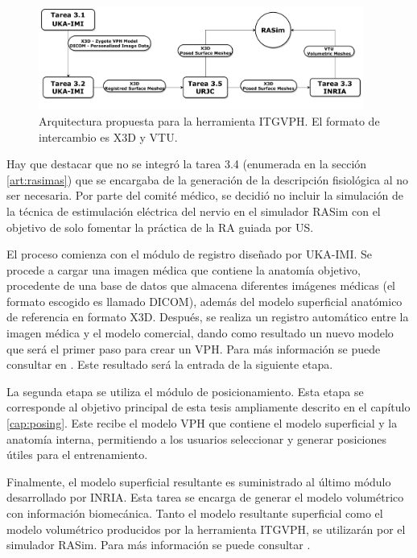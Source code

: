 \begin{figure}
    \centering
    \includegraphics[width=0.95\textwidth]{IMG/DiagramaITGVPH.pdf}
    \caption{Arquitectura propuesta para la herramienta \ac{ITGVPH}. El formato de intercambio es \ac{X3D} y \ac{VTU}.}
    \label{fig:toolarq}
\end{figure}

Hay que destacar que no se integró  la tarea 3.4 (enumerada en la sección \ref{art:rasimas}) que se encargaba de la generación de la descripción fisiológica al no ser necesaria. Por parte del comité médico, se decidió no incluir la simulación de la técnica de estimulación eléctrica del nervio en el simulador \ac{RASim} con el objetivo de solo fomentar la práctica de la \ac{RA} guiada por \ac{US}.

El proceso comienza con el módulo de registro diseñado por \ac{UKA-IMI}. Se procede a cargar una imagen médica que contiene la anatomía objetivo, procedente de una base de datos que almacena diferentes imágenes médicas (el formato escogido es llamado \acs{DICOM}), además del modelo superficial anatómico de referencia en formato \ac{X3D}. Después, se realiza un registro automático entre la imagen médica y el modelo comercial, dando como resultado un nuevo modelo que será el primer paso para crear un \ac{VPH}. Para más información se puede consultar en \cite{deOliveira:2015}. Este resultado será la entrada de la siguiente etapa.

La segunda etapa se utiliza el módulo de posicionamiento. Esta etapa se corresponde al objetivo principal de esta tesis ampliamente descrito en el capítulo \ref{cap:posing}. Este recibe el modelo \ac{VPH} que contiene el modelo superficial y la anatomía interna, permitiendo a los usuarios seleccionar y generar posiciones útiles para el entrenamiento.

Finalmente, el modelo superficial resultante es suministrado al último módulo desarrollado por \ac{INRIA}. Esta tarea se encarga de generar el modelo volumétrico con  información biomecánica.
Tanto el modelo resultante superficial como el modelo volumétrico producidos por la herramienta \ac{ITGVPH}, se utilizarán por el simulador \ac{RASim}. Para más información se puede consultar \cite{ded3.3}.



